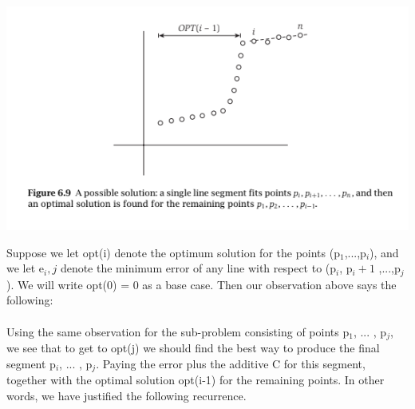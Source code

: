 \documentclass{article}
\begin{document}
\begin{center}
    \includegraphics[]{figures/fig14.png}
\end{center}

Suppose we let opt(i) denote the optimum solution for the points (p$_1$,...,p$_i$), and we let e$_i,j$ denote the minimum error of any line with respect to (p$_i$, p$_i+1$ ,...,p$_j$). We will write opt(0) = 0 as a base case. Then our observation above says the following:\\

\\

Using the same observation for the sub-problem consisting of points p$_1$, ... , p$_j$, we see that to get to opt(j) we should find the best way to produce the final segment p$_i$, ... , p$_j$. Paying the error plus the additive C for this segment, together with the optimal solution opt(i-1) for the remaining points. In other words, we have justified the following recurrence.\\

\end{document}
